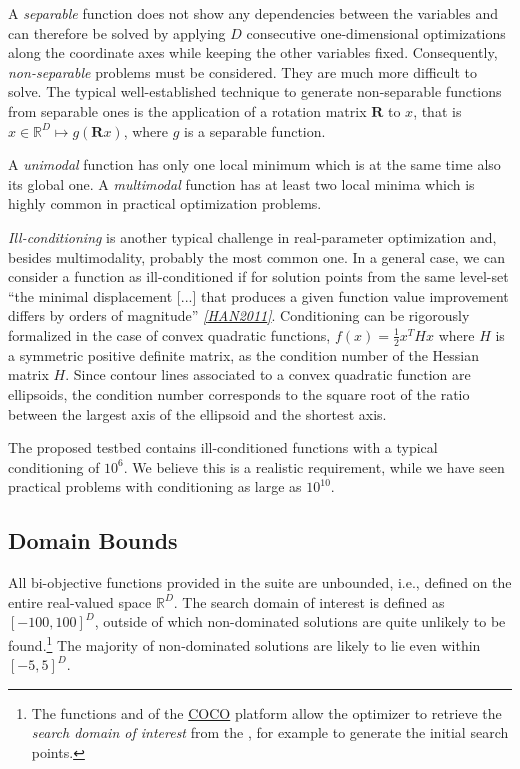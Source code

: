 \documentclass[letterpaper,12pt,english]{article}
\begin{document}
A \emph{separable} function does not show any dependencies between the
variables and can therefore be solved by applying \(D\) consecutive
one-dimensional optimizations along the coordinate axes while
keeping the other variables fixed. Consequently, \emph{non-separable}
problems must be considered. They are much more difficult to solve. The
typical well-established technique to generate non-separable
functions from separable ones is the application of a rotation matrix
\(\mathbf R\) to \(x\), that is \(x \in \mathbb{R}^D \mapsto g(\mathbf R x)\),
where \(g\) is a separable function.

A \emph{unimodal} function has only one local minimum which is at the same
time also its global one.
A \emph{multimodal} function has at least two local minima which is highly common
in practical optimization problems.

\emph{Ill-conditioning} is another typical challenge in real-parameter
optimization and, besides multimodality, probably the most common one.
In a general case, we can consider a function as ill-conditioned if for
solution points from the same level-set ``the minimal displacement {[}...{]} that
produces a given function value improvement differs by
orders of magnitude'' \label{index:id14}{\hyperref[index:han2011]{\emph{{[}HAN2011{]}}}}.
Conditioning can be rigorously formalized in the
case of convex quadratic functions,
\(f(x) = \frac{1}{2} x^THx\) where \(H\) is a symmetric
positive definite matrix, as the condition number of the Hessian matrix
\(H\). Since contour lines associated to a convex quadratic function
are ellipsoids, the condition number corresponds to the square root of
the ratio between the largest axis of the ellipsoid and the shortest axis.

The proposed  testbed contains ill-conditioned functions
with a typical conditioning of \(10^6\). We believe this is a realistic
requirement, while we have seen practical problems with conditioning
as large as \(10^{10}\).


\subsection{Domain Bounds}
\label{index:domain-bounds}
All bi-objective functions provided in the  suite are unbounded,
i.e., defined on the entire real-valued space \(\mathbb{R}^D\).
The search domain of interest is defined as \([-100,100]^D\), outside of
which non-dominated solutions are quite unlikely to be found.\footnote[3]{
The functions \href{http://numbbo.github.io/coco-doc/C/coco\_8h.html\#a4ea6c067adfa866b0179329fe9b7c458}{} and
\href{http://numbbo.github.io/coco-doc/C/coco\_8h.html\#a29c89e039494ae8b4f8e520cba1eb154}{}
of the \href{https://github.com/numbbo/coco}{COCO} platform allow the optimizer
to retrieve the \emph{search domain of interest} from the \href{http://numbbo.github.io/coco-doc/C/coco\_8h.html\#a408ba01b98c78bf5be3df36562d99478}{},
for example to generate the initial search points.
} The majority of non-dominated solutions are likely to lie even within \([-5,5]^D\).
\end{document}
